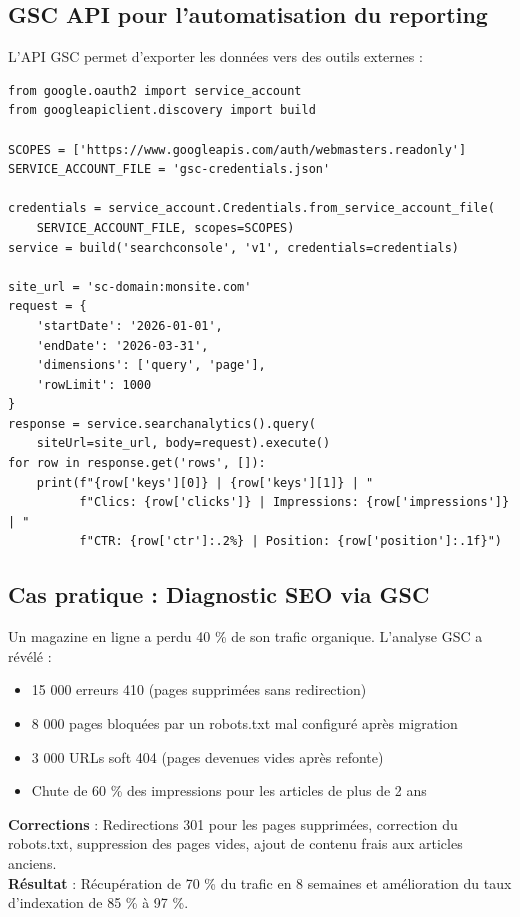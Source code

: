 \documentclass[12pt,a4paper,twoside]{report}
\begin{document}
\subsection{GSC API pour l'automatisation du reporting}

L'API GSC permet d'exporter les données vers des outils externes :

\begin{lstlisting}[style=htmlcode,caption={Script Python pour exporter les données GSC}]
from google.oauth2 import service_account
from googleapiclient.discovery import build

SCOPES = ['https://www.googleapis.com/auth/webmasters.readonly']
SERVICE_ACCOUNT_FILE = 'gsc-credentials.json'

credentials = service_account.Credentials.from_service_account_file(
    SERVICE_ACCOUNT_FILE, scopes=SCOPES)
service = build('searchconsole', 'v1', credentials=credentials)

site_url = 'sc-domain:monsite.com'
request = {
    'startDate': '2026-01-01',
    'endDate': '2026-03-31',
    'dimensions': ['query', 'page'],
    'rowLimit': 1000
}
response = service.searchanalytics().query(
    siteUrl=site_url, body=request).execute()
for row in response.get('rows', []):
    print(f"{row['keys'][0]} | {row['keys'][1]} | "
          f"Clics: {row['clicks']} | Impressions: {row['impressions']} | "
          f"CTR: {row['ctr']:.2%} | Position: {row['position']:.1f}")
\end{lstlisting}

\subsection{Cas pratique : Diagnostic SEO via GSC}

Un magazine en ligne a perdu 40 \% de son trafic organique. L'analyse GSC a révélé :
\begin{itemize}
    \item 15 000 erreurs 410 (pages supprimées sans redirection)
    \item 8 000 pages bloquées par un robots.txt mal configuré après migration
    \item 3 000 URLs soft 404 (pages devenues vides après refonte)
    \item Chute de 60 \% des impressions pour les articles de plus de 2 ans
\end{itemize}
\textbf{Corrections} : Redirections 301 pour les pages supprimées, correction du robots.txt, suppression des pages vides, ajout de contenu frais aux articles anciens. \\
\textbf{Résultat} : Récupération de 70 \% du trafic en 8 semaines et amélioration du taux d'indexation de 85 \% à 97 \%.
\end{document}
